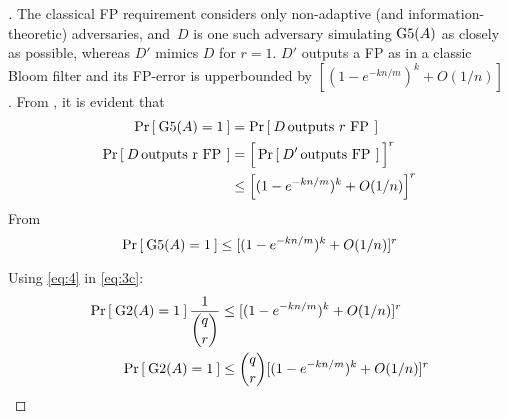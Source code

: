 \begin{proof}[]
The classical FP requirement considers only non-adaptive (and information-theoretic) adversaries, and~$D$ is one such adversary simulating $\text{G5}(A)$ as closely as possible, whereas $D'$ mimics $D$ for $r=1$. $D'$ outputs a FP as in a classic Bloom filter and its FP-error is upperbounded by $[(1-e^{-kn/m})^k +O(1/n)]$ \cite{KirschMitzenmacher}.  %
\noindent
From , it is evident that 
\begin{align}
\Pr\left[\: \text{G5}(A)=1 \:\right] &= \Pr\left[\: D \, \mbox{outputs $r$ FP} \, \:\right]\label{eq:4a}\\
\nonumber \Pr\left[\: D \, \mbox{outputs r FP} \, \:\right] &=  \Big[\Pr\left[\: D' \, \mbox{outputs FP} \, \:\right]\Big]^r\\
& \leq \Big[(1-e^{-kn/m})^k +O(1/n)\Big]^r \label{eq:4b}
\end{align}
\noindent
From 
\begin{equation}
\Pr\left[\: \text{G5}(A)=1 \:\right] \leq [(1-e^{-kn/m})^k + O(1/n)]^r \label{eq:4}
\end{equation}

\noindent
Using \ref{eq:4} in \ref{eq:3c}:
\begin{align}
\nonumber \Pr\left[\: \text{G2}(A)=1 \:\right]\frac{1}{\dbinom{q}{r}}  &\leq [(1-e^{-kn/m})^k +O(1/n)]^r\\
 \Pr\left[\: \text{G2}(A)=1 \:\right]  & \leq \dbinom{q}{r}[(1-e^{-kn/m})^k +O(1/n)]^r\label{eq:5}
\end{align}

\noindent

\fi
\end{proof}

